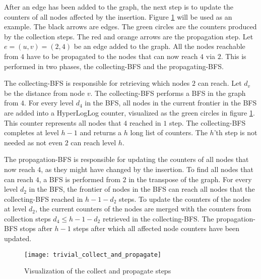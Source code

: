 After an edge has been added to the graph, the next step is to update the counters of all nodes affected by the insertion. Figure \ref{fig:collect_and_propagate} will be used as an example. The black arrows are edges. The green circles are the counters produced by the collection steps. The red and orange arrows are the propagation step. Let $e = (u,v) = (2,4)$ be an edge added to the graph. All the nodes reachable from $4$ have to be propagated to the nodes that can now reach $4$ via $2$. This is performed in two phases, the collecting-BFS and the propagating-BFS.

The collecting-BFS is responsible for retrieving which nodes $2$ can reach. Let $d_v$ be the distance from node $v$. The collecting-BFS performs a BFS in the graph from $4$. For every level $d_4$ in the BFS, all nodes in the current frontier in the BFS are added into a HyperLogLog counter, visualized as the green circles in figure \ref{fig:collect_and_propagate}. This counter represents all nodes that $4$ reached in $1$ step. The collecting-BFS completes at level $h-1$ and returns a $h$ long list of counters. The $h$'th step is not needed as not even $2$ can reach level $h$.

The propagation-BFS is responsible for updating the counters of all nodes that now reach $4$, as they might have changed by the insertion. To find all nodes that can reach $4$, a BFS is performed from $2$ in the transpose of the graph. For every level $d_2$ in the BFS, the frontier of nodes in the BFS can reach all nodes that the collecting-BFS reached in $h-1-d_2$ steps. To update the counters of the nodes at level $d_2$, the current counters of the nodes are merged with the counters from collection steps $d_4 \leq h-1-d_2$ retrieved in the collecting-BFS. The propagation-BFS stops after $h-1$ steps after which all affected node counters have been updated.\\

\begin{figure}[h]
\centering
\texttt{[image: trivial\_collect\_and\_propagate]}    
\captionsetup{justification=centering}
\caption {Visualization of the collect and propagate steps}
\label{fig:collect_and_propagate}
\end{figure}

